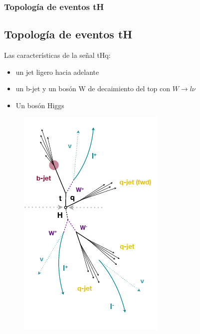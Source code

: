 \documentclass[11pt]{beamer}
\begin{document}
\begin{frame}
\frametitle{Topología de eventos tH}
\subsection{Topología de eventos tH}
\begin{multicols}{2}
\scriptsize{

\vspace{3mm}
Las caracter\'isticas de la se\~nal tHq:
\begin{itemize}
\item un jet ligero hacia adelante 

\item un b-jet y un bos\'on W de decaimiento del top con $W\rightarrow l \nu$ 

\item Un bos\'on Higgs 
\end{itemize}
}
\columnbreak
\begin{figure}
\includegraphics[scale=0.5]{jet.png}
\end{figure}
\end{multicols}
\end{frame}
\end{document}
